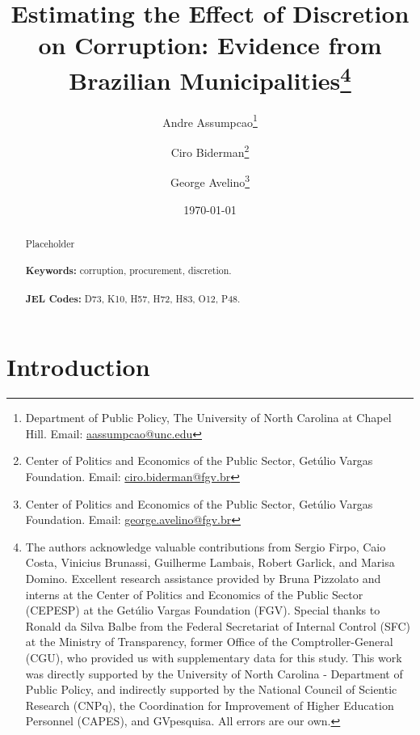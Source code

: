 \documentclass[11pt]{article}
\begin{document}
\begin{titlepage}
\title{Estimating the Effect of Discretion on Corruption: Evidence from Brazilian Municipalities\thanks{The authors acknowledge valuable contributions from Sergio Firpo, Caio Costa, Vinicius Brunassi, Guilherme Lambais,
Robert Garlick, and Marisa Domino. Excellent research assistance provided by Bruna Pizzolato and interns at the Center of Politics and Economics of the Public Sector (CEPESP) at the Getúlio Vargas Foundation (FGV). Special thanks to Ronald da Silva Balbe from the Federal Secretariat of Internal Control (SFC) at the Ministry of Transparency, former Office of the Comptroller-General (CGU), who provided us with supplementary data for this study. This work was directly supported by the University of North Carolina - Department of Public Policy, and indirectly supported by the National Council of Scientic Research (CNPq), the Coordination for Improvement of Higher Education Personnel (CAPES), and GVpesquisa. All errors are our own.}}
\author{Andre Assumpcao\thanks{Department of Public Policy, The University of North Carolina at Chapel Hill. Email: \href{mailto:aassumpcao@unc.edu}{aassumpcao@unc.edu}} \and Ciro Biderman\thanks{Center of Politics and Economics of the Public Sector, Getúlio Vargas Foundation. Email: \href{mailto:ciro.biderman@fgv.br}{ciro.biderman@fgv.br}} \and George Avelino\thanks{Center of Politics and Economics of the Public Sector, Getúlio Vargas Foundation. Email: \href{mailto:george.avelino@fgv.br}{george.avelino@fgv.br}}}
\date{\today}
\maketitle
\begin{abstract}
\noindent Placeholder\\
\vspace{0in}\\
\noindent\textbf{Keywords:} corruption, procurement, discretion.\\
\vspace{0in}\\
\noindent\textbf{JEL Codes:} D73, K10, H57, H72, H83, O12, P48.\\

\bigskip
\end{abstract}
\setcounter{page}{0}
\thispagestyle{empty}
\end{titlepage}
\pagebreak \newpage


\section{Introduction} \label{sec:introduction}
\end{document}
